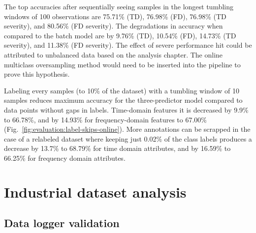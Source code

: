 The top accuracies after sequentially seeing samples in the longest tumbling windows of 100 observations are 75.71\% (TD), 76.98\% (FD), 76.98\% (TD severity), and 80.56\% (FD severity). The degradations in accuracy when compared to the batch model are by 9.76\% (TD), 10.54\% (FD), 14.73\% (TD severity), and 11.38\% (FD severity). The effect of severe performance hit could be attributed to unbalanced data based on the analysis chapter. The online multiclass oversampling method would need to be inserted into the pipeline to prove this hypothesis.

Labeling every  samples (to 10\% of the dataset) with a tumbling window of 10 samples reduces maximum accuracy for the three-predictor model compared to data points without gaps in labels. Time-domain features it is decreased by 9.9\% to 66.78\%, and by 14.93\% for frequency-domain features to 67.00\% (Fig.~\ref{fig:evaluation:label-skips-online}). More annotations can be scrapped in the case of a relabeled dataset where keeping just 0.02\% of the class labels produces a decrease by 13.7\% to 68.79\% for time domain attributes, and by 16.59\% to 66.25\% for frequency domain attributes.


\section{Industrial dataset analysis}

\subsection{Data logger validation}

